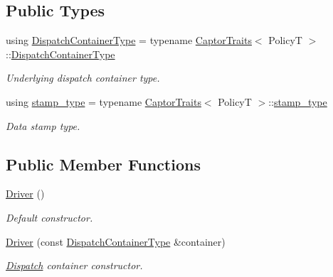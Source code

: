 \subsection*{Public Types}
\begin{DoxyCompactItemize}
\item 
\mbox{\label{classflow_1_1_driver_a422446d9a2d8ae99613e3c5728956921}} 
using \hyperlink{classflow_1_1_driver_a422446d9a2d8ae99613e3c5728956921}{Dispatch\+Container\+Type} = typename \hyperlink{structflow_1_1_captor_traits}{Captor\+Traits}$<$ PolicyT $>$\+::\hyperlink{classflow_1_1_driver_a422446d9a2d8ae99613e3c5728956921}{Dispatch\+Container\+Type}
\begin{DoxyCompactList}\small\item\em Underlying dispatch container type. \end{DoxyCompactList}\item 
\mbox{\label{classflow_1_1_driver_a29830caddd19fac6828c5f3eb8df5e65}} 
using \hyperlink{classflow_1_1_driver_a29830caddd19fac6828c5f3eb8df5e65}{stamp\+\_\+type} = typename \hyperlink{structflow_1_1_captor_traits}{Captor\+Traits}$<$ PolicyT $>$\+::\hyperlink{classflow_1_1_driver_a29830caddd19fac6828c5f3eb8df5e65}{stamp\+\_\+type}
\begin{DoxyCompactList}\small\item\em Data stamp type. \end{DoxyCompactList}\end{DoxyCompactItemize}
\subsection*{Public Member Functions}
\begin{DoxyCompactItemize}
\item 
\mbox{\label{classflow_1_1_driver_a86114eb285347eec527b43e85efc8c2f}} 
\hyperlink{classflow_1_1_driver_a86114eb285347eec527b43e85efc8c2f}{Driver} ()
\begin{DoxyCompactList}\small\item\em Default constructor. \end{DoxyCompactList}\item 
\hyperlink{classflow_1_1_driver_a9de906918fedf1f3ffbc4509a5b8b311}{Driver} (const \hyperlink{classflow_1_1_driver_a422446d9a2d8ae99613e3c5728956921}{Dispatch\+Container\+Type} \&container)
\begin{DoxyCompactList}\small\item\em \hyperlink{classflow_1_1_dispatch}{Dispatch} container constructor. \end{DoxyCompactList}\end{DoxyCompactItemize}
